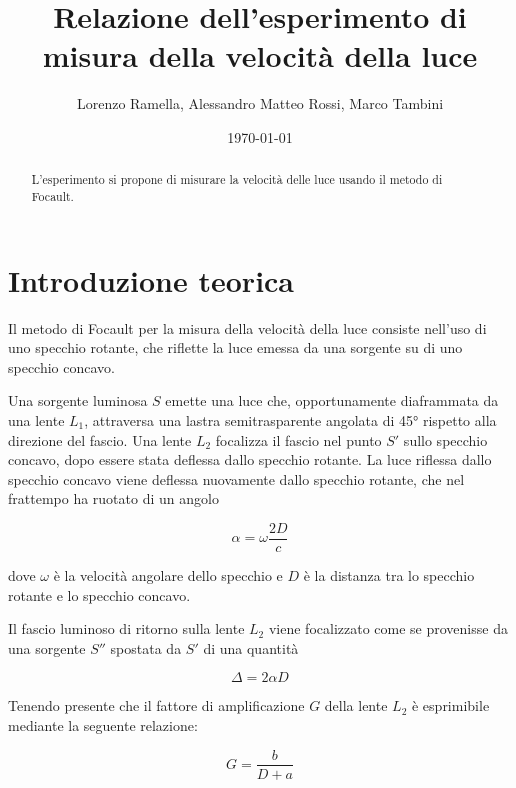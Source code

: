 \documentclass{article}
\title{Relazione dell'esperimento di misura della velocità della luce}
\author{Lorenzo Ramella, Alessandro Matteo Rossi, Marco Tambini}
\date{\today}
\begin{document}
\maketitle


\begin{abstract}
L’esperimento si propone di misurare la velocità delle luce usando il metodo di Focault. %
\end{abstract}


\tableofcontents



\section{Introduzione teorica}
Il metodo di Focault per la misura della velocità della luce consiste nell'uso di uno specchio rotante, che riflette la luce emessa da una sorgente su di uno specchio concavo. 

Una sorgente luminosa $S$ emette una luce che, opportunamente diaframmata da una lente $L_1$, attraversa una lastra semitrasparente angolata di 45° rispetto alla direzione del fascio. Una lente $L_2$ focalizza il fascio nel punto $S'$ sullo specchio concavo, dopo essere stata deflessa dallo specchio rotante. La luce riflessa dallo specchio concavo viene deflessa nuovamente dallo specchio rotante, che nel frattempo ha ruotato di un angolo 

\begin{equation}
\alpha = \omega \frac{2D}{c}
\end{equation}

dove $\omega$ è la velocità angolare dello specchio e $D$ è la distanza tra lo specchio rotante e lo specchio concavo.

Il fascio luminoso di ritorno sulla lente $L_2$ viene focalizzato come se provenisse da una sorgente $S''$ spostata da $S'$ di una quantità 

\begin{equation}
\Delta = 2 \alpha D
\label{DELTA}
\end{equation}

Tenendo presente che il fattore di amplificazione $G$ della lente $L_2$ è esprimibile mediante la seguente relazione:

\begin{equation}
G=\frac{b}{D+a}
\label{G}
\end{equation}
\end{document}
